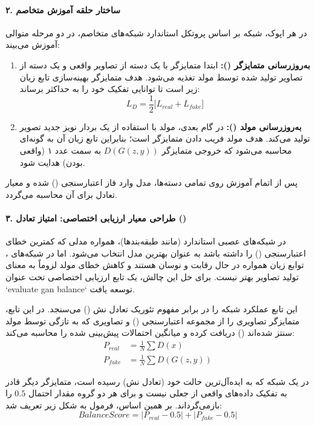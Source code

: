 \documentclass{article}
\begin{document}
\paragraph{۲. ساختار حلقه آموزش متخاصم}
در هر اپوک، شبکه بر اساس پروتکل استاندارد شبکه‌های متخاصم، در دو مرحله متوالی آموزش می‌بیند:

\begin{enumerate}
	\item \textbf{به‌روزرسانی متمایزگر ():} ابتدا متمایزگر با یک دسته از تصاویر واقعی و یک دسته از تصاویر تولید شده توسط مولد تغذیه می‌شود. هدف متمایزگر بهینه‌سازی تابع زیان زیر است تا توانایی تفکیک خود را به حداکثر برساند:
	$$ L_D = \frac{1}{2} \Big[ L_{real} + L_{fake} \Big] $$
	\item \textbf{به‌روزرسانی مولد ():} در گام بعدی، مولد با استفاده از یک بردار نویز جدید تصویر تولید می‌کند. هدف مولد فریب دادن متمایزگر است؛ بنابراین تابع زیان آن به گونه‌ای محاسبه می‌شود که خروجی متمایزگر $D(G(z,y))$ به سمت عدد ۱ (واقعی بودن) هدایت شود.
\end{enumerate}
پس از اتمام آموزش روی تمامی دسته‌ها، مدل وارد فاز اعتبارسنجی () شده و معیار تعادل برای آن محاسبه می‌گردد.

\paragraph{۳. طراحی معیار ارزیابی اختصاصی: امتیاز تعادل ()}
در شبکه‌های عصبی استاندارد (مانند طبقه‌بندها)، همواره مدلی که کمترین خطای اعتبارسنجی () را داشته باشد به عنوان بهترین مدل انتخاب می‌شود. اما در شبکه‌های ، توابع زیان همواره در حال رقابت و نوسان هستند و کاهش خطای مولد لزوماً به معنای تولید تصاویر بهتر نیست. برای حل این چالش، یک تابع ارزیابی اختصاصی تحت عنوان `evaluate gan balance` توسعه یافت.

این تابع عملکرد شبکه را در برابر مفهوم تئوریک تعادل نش () می‌سنجد. در این تابع، متمایزگر تصاویری را از مجموعه اعتبارسنجی () و تصاویری که به تازگی توسط مولد سنتز شده‌اند () دریافت کرده و میانگین احتمالات پیش‌بینی شده را محاسبه می‌کند:
\begin{align*}
	P_{real} &= \frac{1}{N} \sum D(x) \\
	P_{fake} &= \frac{1}{N} \sum D(G(z, y))
\end{align*}

در یک شبکه  که به ایده‌آل‌ترین حالت خود (تعادل نش) رسیده است، متمایزگر دیگر قادر به تفکیک داده‌های واقعی از جعلی نیست و برای هر دو گروه مقدار احتمال $0.5$ را بازمی‌گرداند. بر همین اساس، فرمول  به شکل زیر تعریف شد:
\begin{equation}
	BalanceScore = |P_{real} - 0.5| + |P_{fake} - 0.5|
\end{equation}
\end{document}
